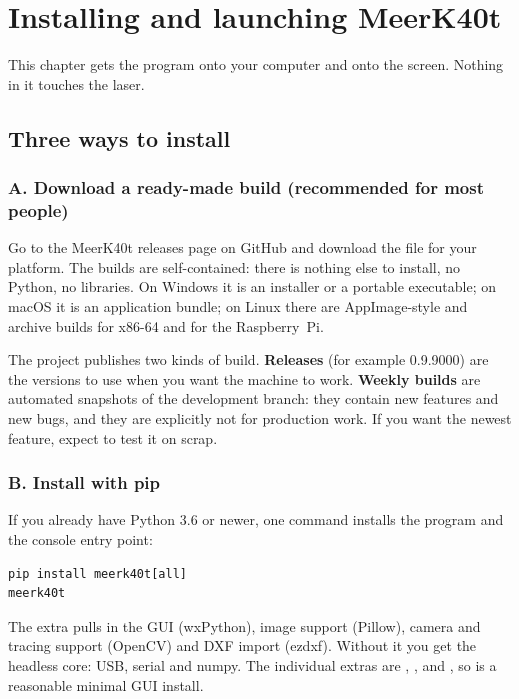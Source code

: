 \chapter{Installing and launching MeerK40t}
\label{ch:install}

This chapter gets the program onto your computer and onto the screen. Nothing in
it touches the laser.

\section{Three ways to install}

\subsection*{A. Download a ready-made build (recommended for most people)}

Go to the MeerK40t releases page on GitHub and download the file for your
platform. The builds are self-contained: there is nothing else to install, no
Python, no libraries. On Windows it is an installer or a portable executable; on
macOS it is an application bundle; on Linux there are AppImage-style and archive
builds for x86-64 and for the Raspberry~Pi.

\begin{warnbox}
The project publishes two kinds of build. \textbf{Releases} (for example
0.9.9000) are the versions to use when you want the machine to work. \textbf{Weekly
builds} are automated snapshots of the development branch: they contain new
features and new bugs, and they are explicitly not for production work. If you
want the newest feature, expect to test it on scrap.
\end{warnbox}

\subsection*{B. Install with pip}

If you already have Python 3.6 or newer, one command installs the program and
the console entry point:

\begin{lstlisting}[style=konsole]
pip install meerk40t[all]
meerk40t
\end{lstlisting}

\noindent The \cmd{[all]} extra pulls in the GUI (wxPython), image support
(Pillow), camera and tracing support (OpenCV) and DXF import (ezdxf). Without it
you get the headless core: USB, serial and numpy. The individual extras are
, ,  and , so
 is a reasonable minimal GUI install.


